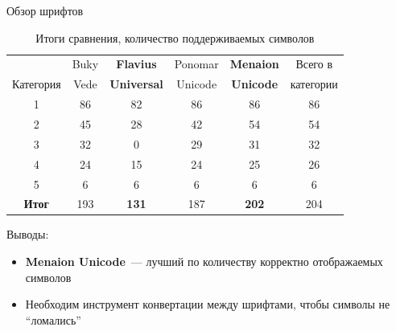 \documentclass
  [ russian
  , aspectratio=1610 %
  ] {beamer}
\begin{document}
\begin{frame}{Обзор шрифтов}

    \begin{table}[H]
            \caption{Итоги сравнения, количество поддерживаемых символов}
            \label{tab:results}
            \centering
            \begin{tabular}{|c|c|c|c|c|c|}
                \hline
                          & Buky & \textbf{Flavius} & Ponomar & \textbf{Menaion} & Всего в\\
                Категория & Vede & \textbf{Universal} & Unicode & \textbf{Unicode} & категории \\
                \hline
                1 & 86 & 82 & 86 & 86 & 86\\
                \hline
                2 & 45 & 28 & 42 & 54 & 54\\
                \hline
                3 & 32 & 0  & 29 & 31 & 32\\
                \hline
                4 & 24 & 15 & 24 & 25 & 26\\
                \hline
                5 & 6  & 6  & 6  & 6  & 6\\
                \hline
                \textbf{Итог} & 193 & \textbf{131} & 187 & \textbf{202} & 204\\
                \hline
            \end{tabular}
        \end{table}

     Выводы:
    \begin{itemize}
        \item \textbf{Menaion Unicode}~--- лучший по количеству корректно отображаемых символов
        \item Необходим инструмент конвертации между шрифтами, чтобы символы не \enquote{ломались}
     \end{itemize}
\end{frame}
\end{document}
